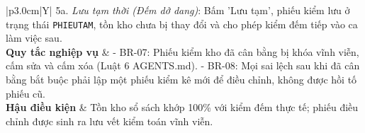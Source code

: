 \documentclass[12pt,a4paper]{report}
\renewcommand{\_}{\textunderscore\allowbreak}
\begin{document}
\begin{table}[H]
\begin{tabularx}{\textwidth}{|p{3.0cm}|Y|}
{5a. \textit{Lưu tạm thời (Đếm dở dang)}: Bấm 'Lưu tạm', phiếu kiểm lưu ở trạng thái \texttt{PHIEU\_TAM}, tồn kho chưa bị thay đổi và cho phép kiểm đếm tiếp vào ca làm việc sau.
} \\
\hline
\textbf{Quy tắc nghiệp vụ} & - BR-07: Phiếu kiểm kho đã cân bằng bị khóa vĩnh viễn, cấm sửa và cấm xóa (Luật 6 AGENTS.md).\newline
- BR-08: Mọi sai lệch sau khi đã cân bằng bắt buộc phải lập một phiếu kiểm kê mới để điều chỉnh, không được hồi tố phiếu cũ. \\
\hline
\textbf{Hậu điều kiện} & Tồn kho sổ sách khớp 100\% với kiểm đếm thực tế; phiếu điều chỉnh được sinh ra lưu vết kiểm toán vĩnh viễn. \\
\hline
\end{tabularx}
\caption{Bảng đặc tả Use Case UC-04: Kiểm kê và Cân bằng Kho Tự động qua Transaction}
\label{tab:uc_spec_kiemkho}
\end{table}

\clearpage
\end{document}

